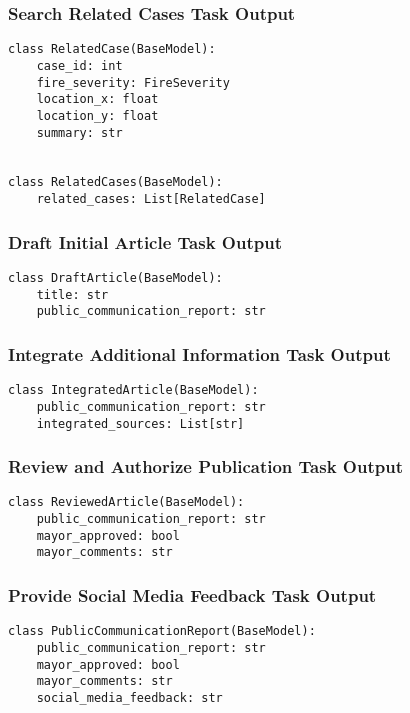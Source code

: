 \subsubsection{Search Related Cases Task Output}
\begin{lstlisting}[caption={Pydantic model for Search Related Cases Task Output}]
class RelatedCase(BaseModel):
    case_id: int
    fire_severity: FireSeverity
    location_x: float
    location_y: float
    summary: str


class RelatedCases(BaseModel):
    related_cases: List[RelatedCase]
\end{lstlisting}

\subsubsection{Draft Initial Article Task Output}
\begin{lstlisting}[caption={Pydantic model for Draft Initial Article Task Output}]
class DraftArticle(BaseModel):
    title: str
    public_communication_report: str
\end{lstlisting}

\subsubsection{Integrate Additional Information Task Output}
\begin{lstlisting}[caption={Pydantic model for Integrate Additional Information Task Output}]
class IntegratedArticle(BaseModel):
    public_communication_report: str
    integrated_sources: List[str]
\end{lstlisting}

\subsubsection{Review and Authorize Publication Task Output}
\begin{lstlisting}[caption={Pydantic model for Review and Authorize Publication Task Output}]
class ReviewedArticle(BaseModel):
    public_communication_report: str
    mayor_approved: bool
    mayor_comments: str
\end{lstlisting}

\subsubsection{Provide Social Media Feedback Task Output}
\begin{lstlisting}[caption={Pydantic model for Provide Social Media Feedback Task Output}]
class PublicCommunicationReport(BaseModel):
    public_communication_report: str
    mayor_approved: bool
    mayor_comments: str
    social_media_feedback: str
\end{lstlisting}

